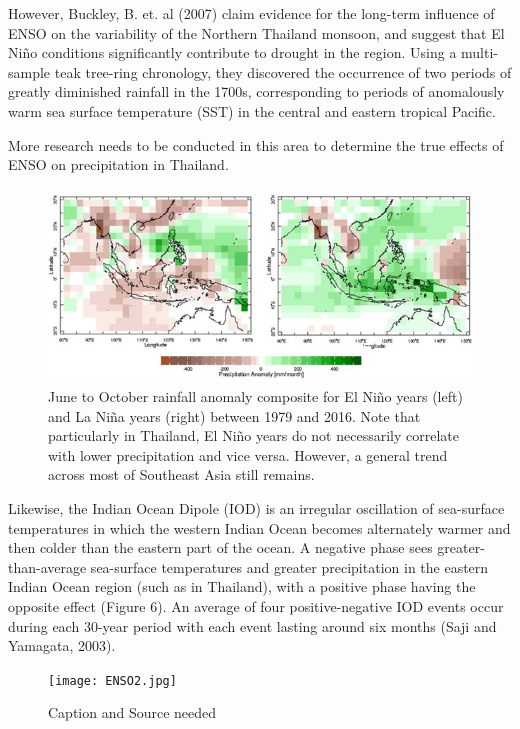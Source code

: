 However, Buckley, B. et. al (2007) claim evidence for the long-term influence of ENSO on the variability of the Northern Thailand monsoon, and suggest that El Niño conditions significantly contribute to drought in the region. Using a multi-sample teak tree-ring chronology, they discovered the occurrence of two periods of greatly diminished rainfall in the 1700s, corresponding to periods of anomalously warm sea surface temperature (SST) in the central and eastern tropical Pacific. 

More research needs to be conducted in this area to determine the true effects of ENSO on precipitation in Thailand.

\begin{figure}[h]
	\centering
		\includegraphics[width=1.00\textwidth]{graphics/Rainfall_Anomly_Thailand.jpg}
	\caption{June to October rainfall anomaly composite for El Niño years (left) and La Niña years (right) between 1979 and 2016. Note that particularly in Thailand, El Niño years do not necessarily correlate with lower precipitation and vice versa. However, a general trend across most of Southeast Asia still remains.}
	\label{fig:Rainfall_Anomly_Thailand}
\end{figure}

Likewise, the Indian Ocean Dipole (IOD) is an irregular oscillation of sea-surface temperatures in which the western Indian Ocean becomes alternately warmer and then colder than the eastern part of the ocean. A negative phase sees greater-than-average sea-surface temperatures and greater precipitation in the eastern Indian Ocean region (such as in Thailand), with a positive phase having the opposite effect (Figure 6). An average of four positive-negative IOD events occur during each 30-year period with each event lasting around six months (Saji and Yamagata, 2003).

\begin{figure}[h]
	\centering
		\texttt{[image: ENSO2.jpg]}
	\caption{Caption and Source needed}
	\label{fig:ENSO2}
\end{figure}


